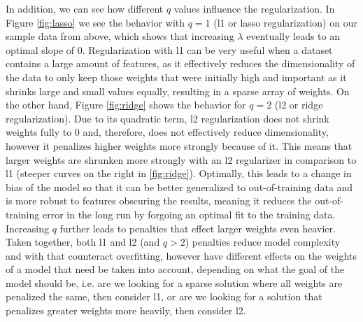 \documentclass[11pt, a4paper]{article}
\begin{document}
In addition, we can see how different $q$ values influence the regularization. In Figure \ref{fig:lasso} we see the behavior with $q=1$ (l1 or lasso regularization) on our sample data from above, which shows that increasing $\lambda$ eventually leads to an optimal slope of $0$. Regularization with l1 can be very useful when a dataset contains a large amount of features, as it effectively reduces the dimensionality of the data to only keep those weights that were initially high and important as it shrinks large and small values equally, resulting in a sparse array of weights. On the other hand, Figure \ref{fig:ridge} shows the behavior for $q=2$ (l2 or ridge regularization). Due to its quadratic term, l2 regularization does not shrink weights fully to $0$ and, therefore, does not effectively reduce dimensionality, however it penalizes higher weights more strongly because of it. This means that larger weights are shrunken more strongly with an l2 regularizer in comparison to l1 (steeper curves on the right in \ref{fig:ridge}). Optimally, this leads to a change in bias of the model so that it can be better generalized to out-of-training data and is more robust to features obscuring the results, meaning it reduces the out-of-training error in the long run by forgoing an optimal fit to the training data. Increasing $q$ further leads to penalties that effect larger weights even heavier. Taken together, both l1 and l2 (and $q>2$) penalties reduce model complexity and with that counteract overfitting, however have different effects on the weights of a model that need be taken into account, depending on what the goal of the model should be, i.e. are we looking for a sparse solution where all weights are penalized the same, then consider l1, or are we looking for a solution that penalizes greater weights more heavily, then consider l2. 
\end{document}
